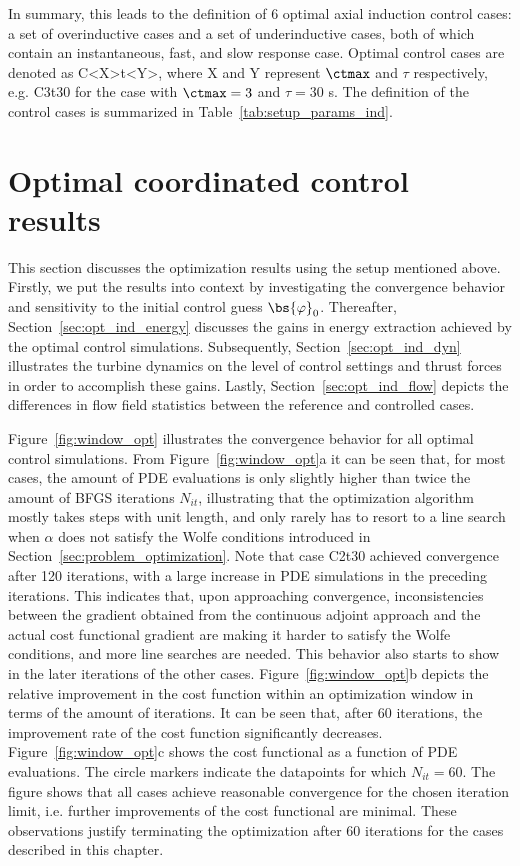 In summary, this leads to the definition of 6 optimal axial induction control cases: a set of overinductive cases and a set of underinductive cases, both of which contain an instantaneous, fast, and slow response case. Optimal control cases are denoted as C<X>t<Y>, where X and Y represent $\ctmax$ and $\tau$ respectively, e.g. C3t30 for the case with $\ctmax=3$ and $\tau=30$ s. The definition of the control cases is summarized in Table~\ref{tab:setup_params_ind}.



\section{Optimal coordinated control results}\label{sec:opt_ind_results}
This section discusses the optimization results using the setup mentioned above. Firstly, we put the results into context by investigating the convergence behavior and sensitivity to the initial control guess $\bs{\varphi}_0$. Thereafter, Section~\ref{sec:opt_ind_energy} discusses the gains in energy extraction achieved by the optimal control simulations. Subsequently, Section~\ref{sec:opt_ind_dyn} illustrates the turbine dynamics on the level of control settings and thrust forces in order to accomplish these gains. Lastly, Section~\ref{sec:opt_ind_flow} depicts the differences in flow field statistics between the reference and controlled cases.

Figure~\ref{fig:window_opt} illustrates the convergence behavior for all optimal control simulations. From Figure~\ref{fig:window_opt}a it can be seen that, for most cases, the amount of PDE evaluations is only slightly higher than twice the amount of BFGS iterations $N_{it}$, illustrating that the optimization algorithm mostly takes steps with unit length, and only rarely has to resort to a line search when $\alpha$ does not satisfy the Wolfe conditions introduced in Section~\ref{sec:problem_optimization}. Note that case C2t30 achieved convergence after 120 iterations, with a large increase in PDE simulations in the preceding iterations. This indicates that, upon approaching convergence, inconsistencies between the gradient obtained from the continuous adjoint approach and the actual cost functional gradient are making it harder to satisfy the Wolfe conditions, and more line searches are needed. This behavior also starts to show in the later iterations of the other cases. Figure~\ref{fig:window_opt}b depicts the relative improvement in the cost function within an optimization window in terms of the amount of iterations. It can be seen that, after 60 iterations, the improvement rate of the cost function significantly decreases. Figure~\ref{fig:window_opt}c shows the cost functional as a function of PDE evaluations. The circle markers indicate the datapoints for which $N_{it} = 60$. The figure shows that all cases achieve reasonable convergence for the chosen iteration limit, i.e. further improvements of the cost functional are minimal. These observations justify terminating the optimization after 60 iterations for the cases described in this chapter. 

